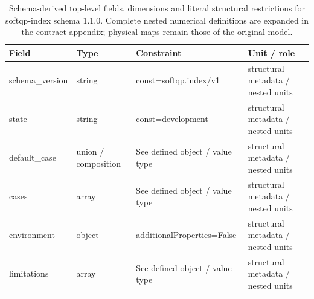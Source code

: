 \begin{table}[htbp]\centering\footnotesize
\caption{Schema-derived top-level fields, dimensions and literal structural restrictions for softqp-index schema 1.1.0. Complete nested numerical definitions are expanded in the contract appendix; physical maps remain those of the original model.}\label{tab:contract-softqp-index}
\begin{tabularx}{\textwidth}{@{}>{\raggedright\arraybackslash}p{}>{\raggedright\arraybackslash}p{}>{\raggedright\arraybackslash}X>{\raggedright\arraybackslash}X@{}}\toprule
Field & Type & Constraint & Unit / role\\\midrule
schema\_\allowbreak{}version & string & const=\allowbreak{}softqp.\allowbreak{}index/\allowbreak{}v1 & structural metadata /\allowbreak{} nested units\\
state & string & const=\allowbreak{}development & structural metadata /\allowbreak{} nested units\\
default\_\allowbreak{}case & union /\allowbreak{} composition & See defined object /\allowbreak{} value type & structural metadata /\allowbreak{} nested units\\
cases & array & See defined object /\allowbreak{} value type & structural metadata /\allowbreak{} nested units\\
environment & object & additionalProperties=\allowbreak{}False & structural metadata /\allowbreak{} nested units\\
limitations & array & See defined object /\allowbreak{} value type & structural metadata /\allowbreak{} nested units\\
\bottomrule\end{tabularx}
\end{table}
